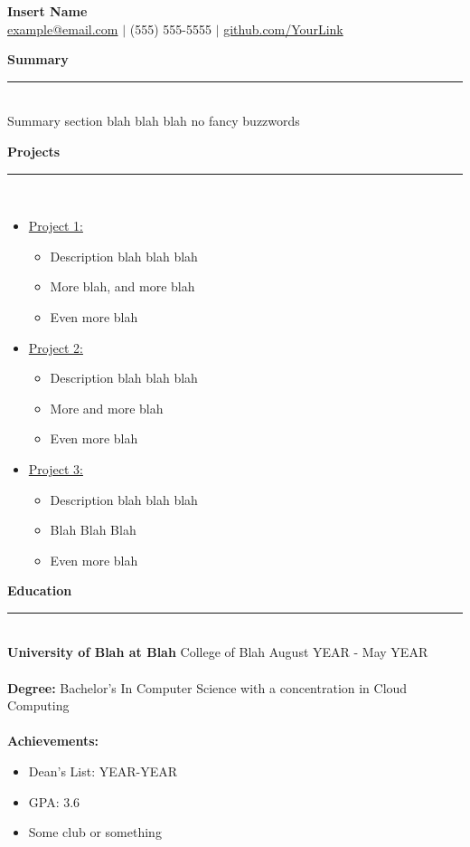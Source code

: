 \documentclass[11pt, letterpaper]{article}
\begin{document}
\pagestyle{empty}

\begin{center}
\textbf{\huge{Insert Name}}\\
\url{example@email.com} $|$ (555) 555-5555 $|$ \url{github.com/YourLink}
\end{center}

\textbf{\large{Summary}}\\
\noindent\rule{17.5cm}{0.4pt}\\
\indent Summary section blah blah blah no fancy buzzwords
\\\newline

\textbf{\large{Projects}}\\
\noindent\rule{17.5cm}{0.4pt}\\
\begin{itemize}
  \item \href{http://github.com/}{Project 1:}

    \begin{itemize}
      \item Description blah blah blah
      \item More blah, and more blah
      \item Even more blah
    \end{itemize}

  \item \href{http://github.com/}{Project 2:}

    \begin{itemize}
      \item Description blah blah blah
      \item More and more blah
      \item Even more blah
    \end{itemize}

  \item \href{http://github.com/}{Project 3:}

    \begin{itemize}
      \item Description blah blah blah
      \item Blah Blah Blah
      \item Even more blah
\newline

    \end{itemize}
\end{itemize}

\textbf{\large{Education}}\\
\noindent\rule{17.5cm}{0.4pt}\\
\indent \textbf{University of Blah at Blah} College of Blah August YEAR - May YEAR\\
\\\indent\textbf{Degree:} Bachelor's In Computer Science with a concentration in Cloud Computing\\
\\\indent\textbf{Achievements:}
\begin{itemize}
  \item Dean's List: YEAR-YEAR
  \item GPA: 3.6
  \item Some club or something
\end{itemize}
\end{document}
